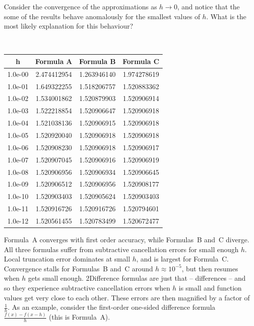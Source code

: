 \documentclass[10pt]{article}
\newcounter{totalQ}\setcounter{totalQ}{1}
\newcommand{\mysecnum}{0}
\newenvironment{clicklist}{%
  \begin{enumerate}
    \renewcommand{\labelenumi}{{\sffamily\bfseries Q{\mysecnum}--\arabic{enumi}.}}
    \renewcommand{\labelenumi}{{\sffamily\bfseries Q{\mysecnum}--\arabic{enumi}${}^\text{\arabic{totalQ}}$.}}
    \setlength{\itemindent}{\widthof{Q}+\labelsep}
  }{%
  \end{enumerate}}
\begin{document}
\begin{clicklist}
{{      Consider the convergence of the approximations as $h\to 0$, and
      notice that the some of the results behave anomalously for the
      smallest values of $h$.  What is the most likely explanation for
      this behaviour?}%
    {%
      {\tt\small
        \begin{tabular}{c|ccc}
          h & Formula A & Formula B & Formula C\\\hline
          1.0e-00 &  2.474412954 & 1.263946140 & 1.974278619\\
          1.0e-01 &  1.649322255 & 1.518206757 & 1.520883362\\
          1.0e-02 &  1.534001862 & 1.520879903 & 1.520906914\\
          1.0e-03 &  1.522218854 & 1.520906647 & 1.520906918\\
          1.0e-04 &  1.521038136 & 1.520906915 & 1.520906918\\
          1.0e-05 &  1.520920040 & 1.520906918 & 1.520906918\\
          1.0e-06 &  1.520908230 & 1.520906918 & 1.520906917\\
          1.0e-07 &  1.520907045 & 1.520906916 & 1.520906919\\
          1.0e-08 &  1.520906956 & 1.520906934 & 1.520906645\\
          1.0e-09 &  1.520906512 & 1.520906956 & 1.520908177\\
          1.0e-10 &  1.520903403 & 1.520905624 & 1.520903403\\
          1.0e-11 &  1.520916726 & 1.520916726 & 1.520794601\\
          1.0e-12 &  1.520561455 & 1.520783499 & 1.520672477\\
        \end{tabular}}}}%
  {Formula~A converges with first order accuracy, while Formulas~B and~C
    diverge.}%
  {All three formulas suffer from subtractive cancellation errors for
    small enough $h$.}%
  {Local truncation error dominates at small $h$, and is largest for
    Formula~C.}%
  {Convergence stalls for Formulas~B and~C around $h\approx 10^{-5}$, but
    then resumes when $h$ gets small enough.}%
  {2}{Difference formulas are just that -- differences -- and so they
    experience subtractive cancellation errors when $h$ is small and
    function values get very close to each other.  These errors are then
    magnified by a factor of $\frac{1}{h}$.  As an example, consider the
    first-order one-sided difference formula $\frac{f(x)-f(x-h)}{h}$
    (this is Formula~A).
  }{\jms}



\end{clicklist}
\end{document}
